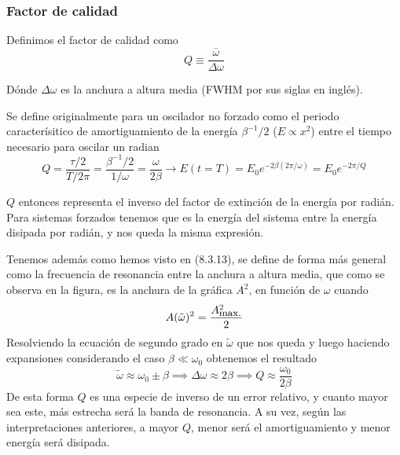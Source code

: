 \subsubsection{Factor de calidad}
Definimos el factor de calidad como
\begin{equation} \label{6.1.1}
    Q \equiv  \frac{\bar{\omega}}{\Delta \omega}
\end{equation}

Dónde $\Delta \omega$ es la anchura a altura media (FWHM por sus siglas en inglés).

Se define originalmente para un oscilador no forzado como el periodo caracterísitico de amortiguamiento de la energía $\beta^{-1}/2$ ($E \propto x^2$) entre el tiempo necesario para oscilar un radian
\begin{equation} \label{6.1.1}
    Q = \frac{\tau / 2}{T/ 2\pi} = \frac{\beta^{-1}/2}{1/\omega} = \frac{\omega}{2\beta} \rightarrow E (t = T) = E_0 e^{-2 \beta (2\pi/\omega)} = E_0 e^{-2\pi/Q}
\end{equation}
$Q$ entonces representa el inverso del factor de extinción de la energía \newline por radián. Para sistemas forzados tenemos que es la energía del sistema \newline entre  la energía disipada por radián, y nos queda la misma expresión.

Tenemos además como hemos visto en (8.3.13), se define de forma más general \newline como la frecuencia de resonancia entre la anchura a altura media, que como se observa en la figura, es la anchura de la gráfica $A^2$, en función de $\omega$ cuando 
\begin{equation} \label{6.1.1}
    A(\tilde{\omega})^2 = \frac{A^2_{\mbox{\small max.}}}{2}
\end{equation}
Resolviendo la ecuación de segundo grado en $\tilde{\omega}$ que nos queda y luego haciendo expansiones considerando el caso $\beta \ll \omega_0$ obtenemos el resultado
\begin{equation} \label{6.1.1}
    \tilde{\omega} \approx \omega_0 \pm \beta \implies \Delta \omega \approx 2\beta \implies Q \approx \frac{\omega_0}{2\beta}
\end{equation}
De esta forma $Q$ es una especie de inverso de un error relativo, y cuanto mayor sea este, más estrecha será la banda de resonancia. A su vez, según las interpretaciones anteriores, a mayor $Q$, menor será el amortiguamiento y menor energía será disipada.
